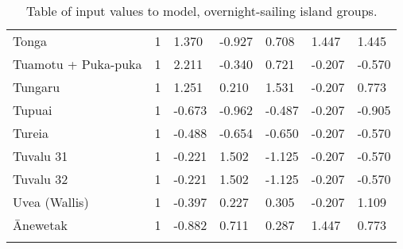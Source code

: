 \begin{longtable}{p{4.5cm}p{1.4cm}p{1.4cm}p{1.4cm}p{1.4cm}p{1.7cm}p{1.7cm}}
  Tonga & 1 & 1.370 & -0.927 & 0.708 & 1.447 & 1.445 \\ 
  Tuamotu + Puka-puka & 1 & 2.211 & -0.340 & 0.721 & -0.207 & -0.570 \\ 
  Tungaru & 1 & 1.251 & 0.210 & 1.531 & -0.207 & 0.773 \\ 
  Tupuai & 1 & -0.673 & -0.962 & -0.487 & -0.207 & -0.905 \\ 
  Tureia & 1 & -0.488 & -0.654 & -0.650 & -0.207 & -0.570 \\ 
  Tuvalu 31 & 1 & -0.221 & 1.502 & -1.125 & -0.207 & -0.570 \\ 
  Tuvalu 32 & 1 & -0.221 & 1.502 & -1.125 & -0.207 & -0.570 \\ 
  Uvea (Wallis) & 1 & -0.397 & 0.227 & 0.305 & -0.207 & 1.109 \\ 
  Ānewetak & 1 & -0.882 & 0.711 & 0.287 & 1.447 & 0.773 \\ 
   \bottomrule
\caption{Table of input values to model, overnight-sailing island groups.} 
\label{appendix_SBZR_table}
\end{longtable}
